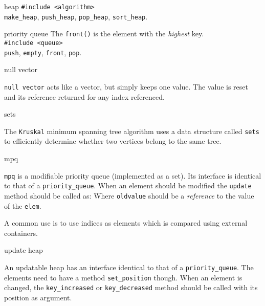 \begin{algorithm}{heap}
\usage{}
{\tt \#include <algorithm>}\\
{\tt make\_heap}, {\tt push\_heap}, {\tt pop\_heap}, {\tt sort\_heap}.
\end{algorithm}

\begin{algorithm}{priority queue}
The {\tt front()} is the element with the {\em highest} key.\\
\usage{}
{\tt \#include <queue>}\\
{\tt push}, {\tt empty}, {\tt front}, {\tt pop}.
\end{algorithm}

\begin{algorithm}{null vector}

{\tt null vector} acts like a vector, but simply keeps one value.
The value is reset and its reference returned for any index referenced.
\end{algorithm}

\begin{algorithm}{sets}

The {\tt Kruskal} minimum spanning tree algorithm uses a data structure
called {\tt sets} to efficiently determine whether two vertices belong to
the same tree.
\end{algorithm}

\begin{algorithm}{mpq}

{\tt mpq} is a modifiable priority queue (implemented as a set). Its interface
is identical to that of a {\tt priority\_queue}. When an element should be
modified the {\tt update} method should be called as:
Where {\tt oldvalue} should be a \emph{reference} to the value of the
{\tt elem}.

A common use is to use indices as elements which is compared using external
containers.
\end{algorithm}

\begin{algorithm}{update heap}

An updatable heap has an interface identical to that of a
{\tt priority\_queue}.
The elements need to have a method {\tt set\_position} though. When an element
is changed, the {\tt key\_increased} or {\tt key\_decreased} method should
be called with its position as argument.
\end{algorithm}

\begin{sourceslandscape}
\end{sourceslandscape}
